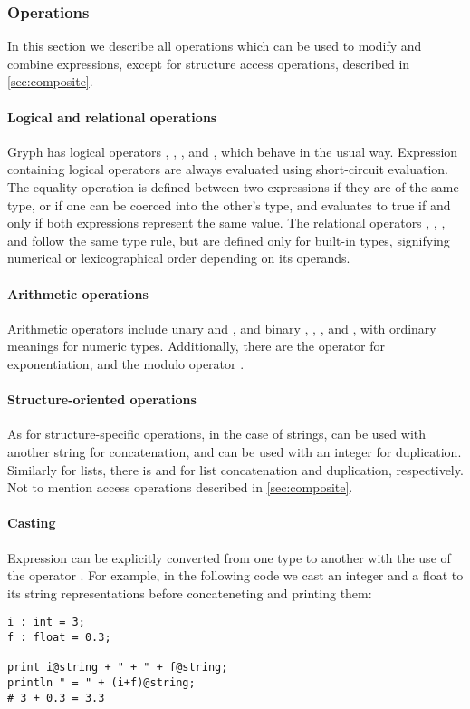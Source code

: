 \subsubsection{Operations}
\label{sec:operations}
In this section we describe all operations which can be used to modify and combine expressions, except for structure access operations, described in \autoref{sec:composite}.

\paragraph{Logical and relational operations}
Gryph has logical operators , , , and , which behave in the usual way. Expression containing logical operators are always evaluated using short-circuit evaluation. The equality operation \key{==} is defined between two expressions if they are of the same type, or if one can be coerced into the other's type, and evaluates to true if and only if both expressions represent the same value. The relational operators \key{<}, \key{>}, \key{<=}, and \key{>=} follow the same type rule, but are defined only for built-in types, signifying numerical or lexicographical order depending on its operands.
\paragraph{Arithmetic operations}
Arithmetic operators include unary \key{-} and \key{+}, and binary \key{+}, \key{-}, \key{*}, and \key{/}, with ordinary meanings for numeric types. Additionally, there are the \key{\^} operator for exponentiation, and the modulo operator \key{\%}.
\paragraph{Structure-oriented operations}
As for structure-specific operations, in the case of strings, \key{+} can be used with another string for concatenation, and \key{*} can be used with an integer for duplication. Similarly for lists, there is \key{++} and \key{**} for list concatenation and duplication, respectively. Not to mention access operations described in \autoref{sec:composite}.

\paragraph{Casting}
\label{sec:casting}
Expression can be explicitly converted from one type to another with the use of the operator . For example, in the following code we cast an integer and a float to its string representations before concateneting and printing them:
\begin{lstlisting}[language=Gryph]
i : int = 3;
f : float = 0.3;

print i@string + " + " + f@string;
println " = " + (i+f)@string;
# 3 + 0.3 = 3.3
\end{lstlisting}